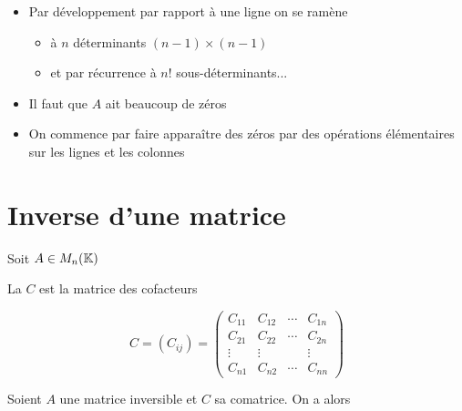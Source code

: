 \begin{frame}

\begin{remarque}

\begin{itemize}
  \item Par développement par rapport à une ligne on se ramène
  \begin{itemize}
  \item à $n$ déterminants $(n-1)\times(n-1)$
  \item\pause et par récurrence à  $n!$ sous-déterminants...
\end{itemize}
  \item\pause Il faut que $A$ ait beaucoup de zéros
  \item\pause  On commence par faire apparaître des zéros par des opérations élémentaires sur les lignes et les colonnes
\end{itemize}
\end{remarque}

\end{frame}



\section{Inverse d'une matrice}

\begin{frame}

Soit $A \in M_n(\mathbb{K})$

La  $C$ est la matrice des cofacteurs

\pause
$$C = (C_{ij}) = \left(
\begin{array}{cccc}
C_{11} & C_{12} & \cdots & C_{1n}\\
C_{21} & C_{22} & \cdots & C_{2n}\\
\vdots & \vdots & & \vdots\\
C_{n1} & C_{n2} & \cdots & C_{nn}
\end{array}\right)
$$

\pause
\begin{theoreme}
Soient $A$ une matrice inversible et $C$ sa comatrice. \pause
On a alors
\end{theoreme}

\end{frame}


